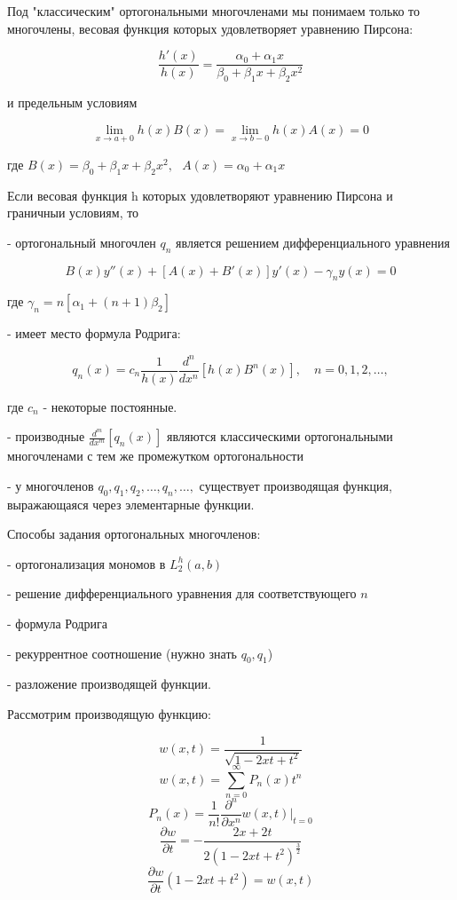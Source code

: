 \documentclass[12pt, a4paper]{report}
\begin{document}
Под "классическим" ортогональными многочленами мы понимаем только то многочлены, весовая функция которых удовлетворяет уравнению Пирсона: 

\[ \frac{h' (x )}{h(x )} = \frac{ \alpha_0 +\alpha_1 x }{\beta_0 + \beta_1 x + \beta_2 x ^2 }   \] 

и предельным условиям 

\[ \lim_{x  \to a+0 } h(x ) B(x ) = \lim_{x \to b -0 } h(x )A(x ) = 0  \] 

где \( B(x ) = \beta_0 + \beta_1 x + \beta_2  x ^2 , \text{ }  A (x ) = \alpha_0    + \alpha_1 x \) 


Если весовая функция h которых удовлетворяют уравнению Пирсона и граничныи условиям, то 

- ортогональный многочлен \( q_n      \) является решением дифференциального уравнения 

\[ B(x ) y''(x )+ [A(x )+ B' (x )]y'(x )- \gamma_n y(x )= 0\] 

где \( \gamma_n = n [ \alpha_1 + (n+1 )\beta_2 ] \) 

- имеет место формула Родрига: 

\[ q_n(x ) = c_n \frac{1 }{h(x )} \frac{d^n }{d x ^n } [ h(x )B^n (x )] , \quad  n=0,1,2,\ldots,  \] 

где \( c_n \) - некоторые постоянные. 

- производные \( \displaystyle  \frac{ d^m }{d x^{m} }  [q_n(x )]\) являются классическими ортогональными многочленами с тем же промежутком ортогональности 

- у многочленов \( q_0,q_1 ,q_2, \ldots, q_n, \ldots,  \) существует производящая функция, выражающаяся через элементарные функции.

Способы задания ортогональных многочленов: 

- ортогонализация  мономов в \( L_2^{h } (a,b ) \) 

- решение дифференциального уравнения для соответствующего \( n \) 

- формула Родрига 

- рекуррентное соотношение (нужно знать \( q_0,q_1 \))

- разложение производящей функции.

Рассмотрим производящую функцию: 

\[ w (x,t ) = \frac{1}{\sqrt{ 1 -2xt + t ^2 }} \]
\[ w(x,t )= \sum_{n =0 }^{\infty  }P_n (x )t^n  \]  
\[ P_n (x ) = \frac{1}{n! } \frac{\partial  ^n }{\partial  x^n }w(x, t ) \bigg | _{ t= 0}   \] 
\[ \frac{\partial  w }{\partial  t } = - \frac{ 2x + 2t }{2(1 -2xt + t ^2 )^{\frac{3}{2} } }   \] 
\[ \frac{\partial  w }{\partial  t }(1 - 2xt + t ^2 ) = w(x,t)  \] 



\ifdefined\mainfile
\else
    
\end{document}
